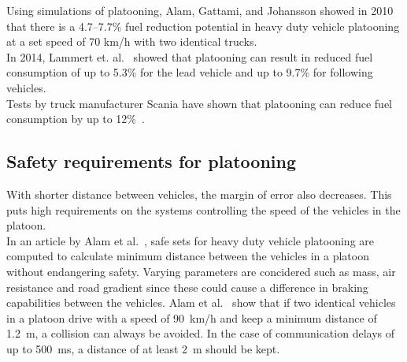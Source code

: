 Using simulations of platooning, Alam, Gattami, and Johansson \cite{johansson2010} showed in 2010 that there is a \mbox{4.7--7.7\%} fuel reduction potential in heavy duty vehicle platooning at a set speed of 70 km/h with two identical trucks.\\

In 2014, Lammert et. al.~\cite{lammert2014} showed that platooning can result in reduced fuel consumption of up to 5.3\% for the lead vehicle and up to 9.7\% for following vehicles.\\

Tests by truck manufacturer Scania have shown that platooning can reduce fuel consumption by up to 12\%~\cite{scania2015}.

\subsection{Safety requirements for platooning}
With shorter distance between vehicles, the margin of error also decreases. This puts high requirements on the systems controlling the speed of the vehicles in the platoon.\\

In an article by Alam et al.~\cite{johansson2013}, safe sets for heavy duty vehicle platooning are computed to calculate minimum distance between the vehicles in a platoon without endangering safety. Varying parameters are concidered such as mass, air resistance and road gradient since these could cause a difference in braking capabilities between the vehicles. Alam et al.~\cite{johansson2013} show that if two identical vehicles in a platoon drive with a speed of 90~km/h and keep a minimum distance of 1.2~m, a collision can always be avoided. In the case of communication delays of up to 500~ms, a distance of at least 2~m should be kept. %
